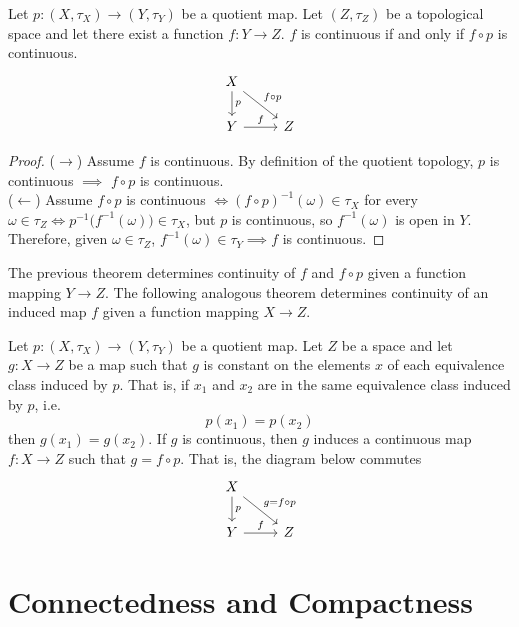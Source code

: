 \documentclass{article}
\begin{document}
    \begin{theorem}
    Let $p: (X, \tau_X) \longrightarrow (Y, \tau_Y)$ be a quotient map. Let $(Z, \tau_Z)$ be a topological space and let there exist a function $f: Y \longrightarrow Z$. $f$ is continuous if and only if $f \circ p$ is continuous. 
    \[\begin{tikzcd}
        X \arrow{d}{p} \arrow{rd}{f \circ p}\\
        Y \arrow{r}{f} & Z
    \end{tikzcd}\]
    \end{theorem}
    \begin{proof}
    ($\rightarrow$) Assume $f$ is continuous. By definition of the quotient topology, $p$ is continuous $\implies$ $f \circ p$ is continuous. \\
    ($\leftarrow$) Assume $f \circ p$ is continuous $\iff (f \circ p)^{-1} (\omega) \in \tau_X$ for every $\omega \in \tau_Z \iff p^{-1} \big( f^{-1}(\omega) \big) \in \tau_X$, but $p$ is continuous, so $f^{-1}(\omega)$ is open in $Y$. Therefore, given $\omega \in \tau_{Z}$, $f^{-1} (\omega) \in \tau_Y \implies f$ is continuous. 
    \end{proof}

    The previous theorem determines continuity of $f$ and $f \circ p$ given a function mapping $Y \longrightarrow Z$. The following analogous theorem determines continuity of an induced map $f$ given a function mapping $X \longrightarrow Z$. 

    \begin{theorem}
    Let $p: (X, \tau_X )\longrightarrow (Y, \tau_Y)$ be a quotient map. Let $Z$ be a space and let $g: X \longrightarrow Z$ be a map such that $g$ is constant on the elements $x$ of each equivalence class induced by $p$. That is, if $x_1$ and $x_2$ are in the same equivalence class induced by $p$, i.e. 
    \[p(x_1) = p(x_2)\]
    then $g(x_1) = g(x_2)$. If $g$ is continuous, then $g$ induces a continuous map $f: X \longrightarrow Z$ such that $g = f \circ p$. That is, 
    the diagram below commutes 
    \[\begin{tikzcd}
        X \arrow{d}{p} \arrow{rd}{g=f \circ p}\\
        Y \arrow{r}{f} & Z
    \end{tikzcd}\]
    \end{theorem}

\section{Connectedness and Compactness}
\end{document}
